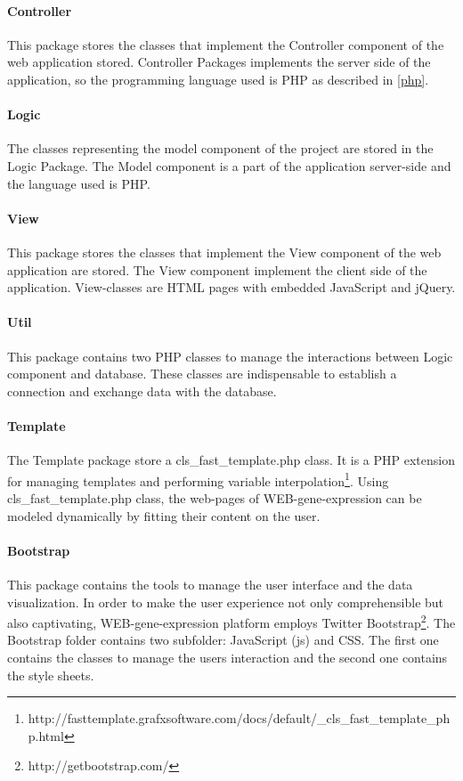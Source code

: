 \documentclass[a4paper]{report}
\begin{document}
\paragraph{Controller} This package stores the classes that implement the Controller component of the web application stored. Controller Packages implements the server side of the application, so the programming language used is PHP as described in \ref{php}.

\paragraph{Logic} The classes representing the model component of the project are stored in the Logic Package. The Model component is a part of the application server-side and the language used is PHP.

\paragraph{View} This package stores the classes that implement the View component of the web application  are stored. The View component implement the client side of the application. View-classes are HTML pages with embedded JavaScript and jQuery.

\paragraph{Util} This package contains two PHP classes to manage the interactions between Logic component and database. These classes are indispensable to establish a connection and exchange data with the database.

\paragraph{Template} The Template package store a cls\_fast\_template.php class. It is a PHP extension for managing templates and performing variable interpolation\footnote{http://fasttemplate.grafxsoftware.com/docs/default/\_cls\_fast\_template\_php.html}.
Using cls\_fast\_template.php class, the web-pages of WEB-gene-expression can be modeled dynamically by fitting their content on the user.

\paragraph{Bootstrap} This package contains the tools to manage the user interface and the data visualization. In order to make the user experience not only comprehensible but also captivating, WEB-gene-expression platform employs Twitter Bootstrap\footnote{http://getbootstrap.com/}. The Bootstrap folder contains two subfolder: JavaScript (js) and CSS. The first one contains the classes to manage the users interaction and the second one contains the style sheets. 
\end{document}
